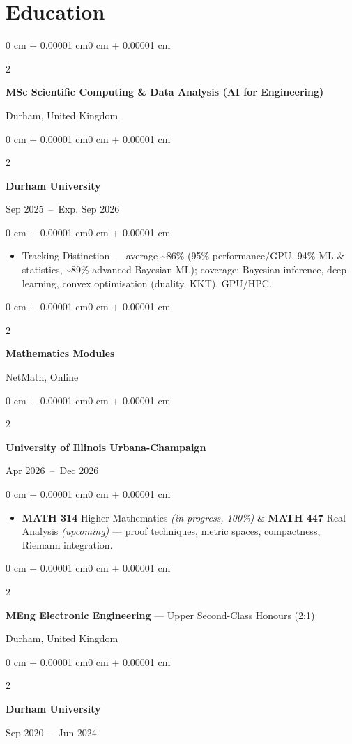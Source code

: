 \documentclass[10pt, letterpaper]{article}
\newenvironment{highlights}{
    \begin{itemize}[
        topsep=0.10 cm,
        parsep=0.10 cm,
        partopsep=0pt,
        itemsep=0pt,
        leftmargin=0 cm + 10pt
    ]
}{
    \end{itemize}
}
\newenvironment{onecolentry}{
    \begin{adjustwidth}{0 cm + 0.00001 cm}{0 cm + 0.00001 cm}
}{
    \end{adjustwidth}
}
\newenvironment{twocolentry}[2][]{
    \onecolentry{}
    \def\secondColumn{#2}
    \setcolumnwidth{\fill, 4.5 cm}
    \begin{paracol}{2}
}{
    \switchcolumn{} \raggedleft{} \secondColumn{}
    \end{paracol}
    \endonecolentry{}
}
\begin{document}
\section*{Education}

\begin{twocolentry}
  {Durham, United Kingdom}
  \textbf{MSc Scientific Computing \& Data Analysis (AI for Engineering)}
\end{twocolentry}
\begin{twocolentry}
  {Sep 2025~--~Exp. Sep 2026}
  \textbf{Durham University}
\end{twocolentry}
\vspace{0.10 cm}

\begin{onecolentry}
  \begin{highlights}
    \item Tracking Distinction --- average \textasciitilde86\% (95\% performance/GPU, 94\% ML \& statistics, \textasciitilde89\% advanced Bayesian ML); coverage: Bayesian inference, deep learning, convex optimisation (duality, KKT), GPU/HPC.
  \end{highlights}
\end{onecolentry}

\vspace{0.08 cm}

\begin{twocolentry}
  {NetMath, Online}
  \textbf{Mathematics Modules}
\end{twocolentry}
\begin{twocolentry}
  {Apr 2026~--~Dec 2026}
  \textbf{University of Illinois Urbana-Champaign}
\end{twocolentry}
\vspace{0.10 cm}
\begin{onecolentry}
  \begin{highlights}
    \item \textbf{MATH 314} Higher Mathematics \textit{(in progress, 100\%)} \& \textbf{MATH 447} Real Analysis \textit{(upcoming)} --- proof techniques, metric spaces, compactness, Riemann integration.
  \end{highlights}
\end{onecolentry}

\vspace{0.08 cm}

\begin{twocolentry}
  {Durham, United Kingdom}
  \textbf{MEng Electronic Engineering} --- Upper Second-Class Honours (2:1)
\end{twocolentry}
\begin{twocolentry}
  {Sep 2020~--~Jun 2024}
  \textbf{Durham University}
\end{twocolentry}
\end{document}
